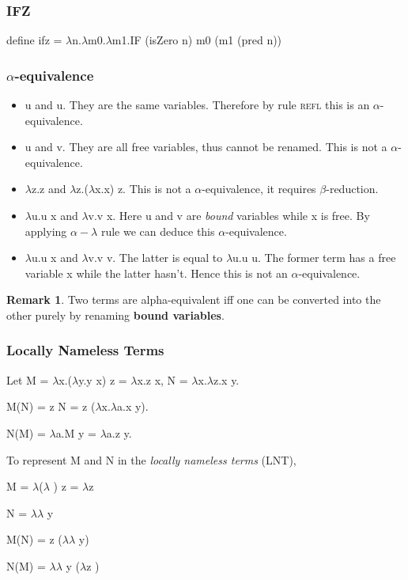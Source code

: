 \documentclass{article}
\theoremstyle{definition}
\newtheorem*{remark}{Remark}
\newcommand{\lb}{$\lambda$}
\begin{document}
\subsubsection*{IFZ}

\begin{tcolorbox}
    \textsf{define} ifz = \lb n.\lb m0.\lb m1.IF (isZero n) m0 (m1 (pred n))
\end{tcolorbox}

\subsubsection*{$\alpha$-equivalence}

\begin{itemize}
    \item u and u. They are the same variables.
          Therefore by rule \textsc{refl} this is an $\alpha$-equivalence.
    \item u and v. They are all free variables, thus cannot be renamed. This is not a $\alpha$-equivalence.
    \item \lb z.z and \lb z.(\lb x.x) z. This is not a $\alpha$-equivalence, it requires $\beta$-reduction.
    \item \lb u.u x and \lb v.v x. Here u and v are \emph{bound} variables while x is free. By applying $\alpha-\lambda$ rule we can deduce this $\alpha$-equivalence.
    \item \lb u.u x and \lb v.v v. The latter is equal to \lb u.u u.
          The former term has a free variable x while the latter hasn't.
          Hence this is not an $\alpha$-equivalence.
\end{itemize}

\begin{remark}
    Two terms are alpha-equivalent iff one can be converted into the other purely by renaming \textbf{bound variables}.
\end{remark}

\subsubsection*{Locally Nameless Terms}

Let M = \lb x.(\lb y.y x) z = \lb x.z x, N = \lb x.\lb z.x y.

M(N) = z N = z (\lb x.\lb a.x y).

N(M) = \lb a.M y = \lb a.z y.

To represent M and N in the \emph{locally nameless terms} (LNT),
\begin{tcolorbox}
    M = \lb (\lb {} ) z = \lb z 

    N = \lb \lb {} y

    M(N) = z (\lb \lb {} y)

    N(M) = \lb \lb {} y (\lb z )
\end{tcolorbox}
\end{document}
